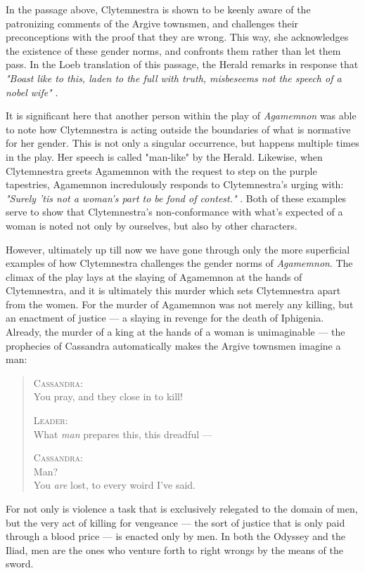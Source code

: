 \noindent
In the passage above, Clytemnestra is shown to be keenly aware of the
patronizing comments of the Argive townsmen, and challenges their preconceptions
with the proof that they are wrong. This way, she acknowledges the existence of
these gender norms, and confronts them rather than let them pass. In the Loeb
translation of this passage, the Herald remarks in response that \emph{"Boast
like to this, laden to the full with truth, misbeseems not the speech of a
nobel wife"} \autocite[613]{loeb}.

\noindent
It is significant here that another person within the play of \emph{Agamemnon}
was able to note how Clytemnestra is acting outside the boundaries of what is
normative for her gender. This is not only a singular occurrence, but happens
multiple times in the play. Her speech is called "man-like" by the Herald.
Likewise, when Clytemnestra greets Agamemnon with the request to step on the
purple tapestries, Agamemnon incredulously responds to Clytemnestra's urging
with: \emph{"Surely 'tis not a woman's part to be fond of contest."}
\autocite[940]{loeb}. Both of these examples serve to show that Clytemnestra's
non-conformance with what's expected of a woman is noted not only by ourselves,
but also by other characters.

However, ultimately up till now we have gone through only the more superficial
examples of how Clytemnestra challenges the gender norms of \emph{Agamemnon}.
The climax of the play lays at the slaying of Agamemnon at the hands of
Clytemnestra, and it is ultimately this murder which sets Clytemnestra apart
from the women. For the murder of Agamemnon was not merely any killing, but an
enactment of justice --- a slaying in revenge for the death of Iphigenia.
Already, the murder of a king at the hands of a woman is unimaginable --- the
prophecies of Cassandra automatically makes the Argive townsmen imagine a man:

\begin{quote}
  \textsc{Cassandra}: \\
  You pray, and they close in to kill!

  \textsc{Leader}: \\
  What \emph{man} prepares this, this dreadful ---

  \textsc{Cassandra}: \\
  Man? \\
  You \emph{are} lost, to every woird I've said.
\end{quote}

\noindent
For not only is violence a task that is exclusively relegated to the domain of
men, but the very act of killing for vengeance --- the sort of justice that is
only paid through a blood price --- is enacted only by men. In both the Odyssey
and the Iliad, men are the ones who venture forth to right wrongs by the means
of the sword.
